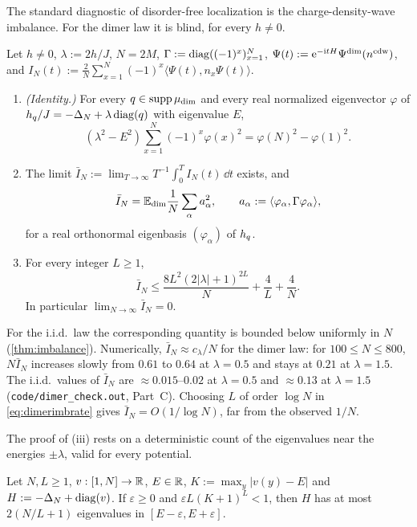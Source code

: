 The standard diagnostic of disorder-free localization \cite{SKKM2017} is the charge-density-wave
imbalance.  For the dimer law it is blind, for every $h\ne0$.

\begin{proposition}\label{prop:dimerimbalance}
Let $h\ne0$, $\lambda:=2h/J$, $N=2M$, $\Gamma:=\operatorname{diag}((-1)^x)_{x=1}^N$, $\Psi(t):=\mathrm{e}^{-\mathrm{i} tH}\Psi^{\mathrm{dim}}(n^{\mathrm{cdw}})$,
and $I_N(t):=\frac2N\sum_{x=1}^N(-1)^x\langle\Psi(t),n_x\Psi(t)\rangle$.
\begin{enumerate}[label=(\roman*)]
\item \emph{(Identity.)}  For every $q\in\operatorname{supp}\mu_{\mathrm{dim}}$ and every real normalized eigenvector $\varphi$ of
$h_{q}/J=-\Delta_N+\lambda\operatorname{diag}(q)$ with eigenvalue $E$,
\begin{equation}\label{eq:dimerimbid}
  (\lambda^2-E^2)\sum_{x=1}^N(-1)^x\varphi(x)^2=\varphi(N)^2-\varphi(1)^2 .
\end{equation}
\item The limit $\bar I_N:=\lim_{T\to\infty}T^{-1}\int_0^TI_N(t)\,\dd t$ exists, and
\[
  \bar I_N=\mathbb{E}_{\mathrm{dim}}\frac1N\sum_\alpha a_\alpha^2,\qquad a_\alpha:=\langle\varphi_\alpha,\Gamma\varphi_\alpha\rangle,
\]
for a real orthonormal eigenbasis $(\varphi_\alpha)$ of $h_{q}$.
\item For every integer $L\ge1$,
\begin{equation}\label{eq:dimerimbrate}
  \bar I_N\le\frac{8L^2(2|\lambda|+1)^{2L}}{N}+\frac4L+\frac4N .
\end{equation}
In particular $\lim_{N\to\infty}\bar I_N=0$.
\end{enumerate}
\end{proposition}

For the i.i.d.\ law the corresponding quantity is bounded below uniformly in $N$ (\cref{thm:imbalance}).
Numerically, $\bar I_N\approx c_\lambda/N$ for the dimer law: for $100\le N\le800$, $N\bar I_N$ increases
slowly from $0.61$ to $0.64$ at $\lambda=0.5$ and stays at $0.21$ at $\lambda=1.5$.  The i.i.d.\ values
of $\bar I_N$ are $\approx0.015$--$0.02$ at $\lambda=0.5$ and $\approx0.13$ at $\lambda=1.5$
(\texttt{code/dimer\_check.out}, Part~C).  Choosing $L$ of order $\log N$ in \eqref{eq:dimerimbrate} gives
$\bar I_N=O(1/\log N)$, far from the observed $1/N$.

The proof of (iii) rests on a deterministic count of the eigenvalues near the energies $\pm\lambda$, valid for
every potential.

\begin{lemma}\label{lem:fewapprox}
Let $N,L\ge1$, $v:[1,N]\to\mathbb{R}$, $E\in\mathbb{R}$, $K:=\max_y|v(y)-E|$ and $H:=-\Delta_N+\operatorname{diag}(v)$.  If $\varepsilon\ge0$
and $\varepsilon L(K+1)^L<1$, then $H$ has at most $2(N/L+1)$ eigenvalues in $[E-\varepsilon,E+\varepsilon]$.
\end{lemma}

